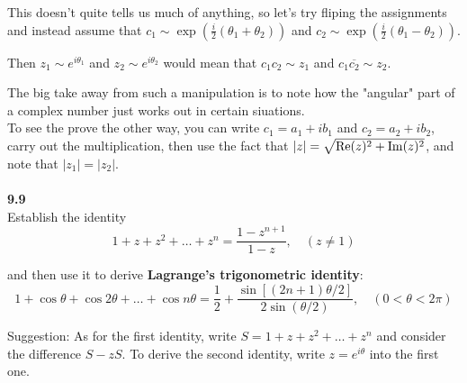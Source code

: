 This doesn't quite tells us much of anything, so let's try fliping the assignments and instead
assume that $c_1 \sim \exp\left(\frac{i}{2}(\theta_1 + \theta_2)\right)$
and $c_2 \sim \exp\left(\frac{i}{2}(\theta_1 - \theta_2)\right)$.

Then $z_1 \sim e^{i\theta_1}$ and $z_2 \sim e^{i\theta_2}$ would mean that $c_1 c_2 \sim z_1$ and $c_1 \overline{c_2} \sim z_2$.

The big take away from such a manipulation is to note how the "angular" part of a complex number just works out in certain siuations.
\\

To see the prove the other way, you can write $c_1 = a_1 + ib_1$ and $c_2 = a_2 + ib_2$, carry out the multiplication,
then use the fact that $|z| = \sqrt{\operatorname{Re}(z)^2 + \operatorname{Im}(z)^2}$, and note that $|z_1| = |z_2|$.
\\~\\





\textbf{9.9}
\\

Establish the identity
$$
1 + z + z^2 + \ldots + z^n = \frac{ 1 - z^{n+1} }{ 1-z }, \quad (z\neq 1)
$$

and then use it to derive \textbf{Lagrange's trigonometric identity}:
$$
1 + \cos\theta + \cos 2\theta + \ldots + \cos n\theta =
\frac{1}{2} + \frac{ \sin\left[(2n+1)\theta/2\right] }{ 2\sin(\theta/2) },
\quad (0 < \theta < 2\pi)
$$

Suggestion: As for the first identity, write $S = 1 + z + z^2 + \ldots + z^n$
and consider the difference $S - zS$.
To derive the second identity, write $z = e^{i\theta}$ into the first one.
\\